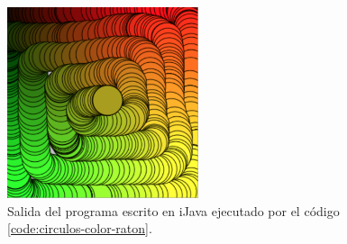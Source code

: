 {{%
%
%
%
%
%
%
%
%
%


\begin{figure}[!ht]
	\begin{centering}
		\includegraphics[width=0.5\textwidth]{images/salida-code-circulos-color-raton.png}
			\caption{Salida del programa escrito en iJava ejecutado por el código \ref{code:circulos-color-raton}.}
				\label{fig:salida-code-circulos-color-raton}
	\end{centering}
\end{figure}



}}
